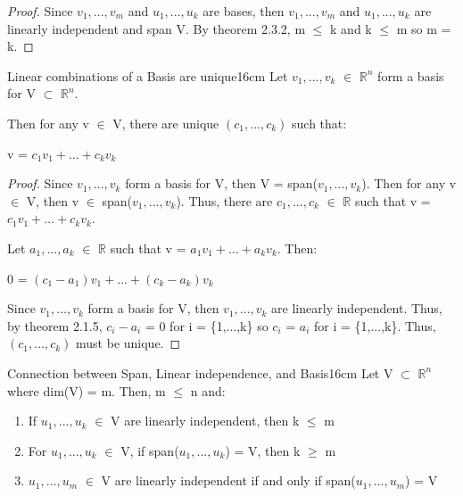     \begin{proof}
        Since $v_1,...,v_m$ and $u_1,...,u_k$ are bases,
        then $v_1,...,v_m$ and $u_1,...,u_k$ are linearly independent
        and span V.
        By {\color{red} theorem 2.3.2}, m $\leq$ k and k $\leq$ m
        so m = k.
    \end{proof}

    \vspace{0.5cm}



    \begin{wtheorem}{Linear combinations of a Basis are unique}{16cm}
        Let $v_1,...,v_k$ $\in$ $\mathbb{R}^n$ form a basis for
        V $\subset$ $\mathbb{R}^n$.
        
        Then for any v $\in$ V, there are unique $(c_1,...,c_k)$ such that:

        \hspace{0.5cm}
        v = $c_1v_1 + ... + c_kv_k$
    \end{wtheorem}

    \begin{proof}
        Since $v_1,...,v_k$ form a basis for V,
        then V = span($v_1,...,v_k$).
        Then for any v $\in$ V, then v $\in$ span($v_1,...,v_k$).
        Thus, there are $c_1,...,c_k$ $\in$ $\mathbb{R}$
        such that v = $c_1v_1 + ... + c_kv_k$.

        Let $a_1,...,a_k$ $\in$ $\mathbb{R}$ such that
        v = $a_1v_1 + ... + a_kv_k$. Then:

        \hspace{0.5cm}
        0 = $(c_1-a_1)v_1 + ... + (c_k-a_k)v_k$

        Since $v_1,...,v_k$ form a basis for V,
        then $v_1,...,v_k$ are linearly independent.
        Thus, by {\color{red} theorem 2.1.5}, $c_i - a_i$ = 0 for
        i = \{1,...,k\} so $c_i$ = $a_i$ for i = \{1,...,k\}.
        Thus, $(c_1,...,c_k)$ must be unique.
    \end{proof}

    \newpage



    \begin{wtheorem}{Connection between Span, Linear independence, and Basis}{16cm}
        Let V $\subset$ $\mathbb{R}^n$ where dim(V) = m. Then, m $\leq$ n and:
    \end{wtheorem}

    \begin{enumerate}[label=(\alph*), leftmargin=2cm, itemsep=0.1cm]
        \item If $u_1,...,u_k$ $\in$ V are linearly independent,
            then k $\leq$ m

        \item For $u_1,...,u_k$ $\in$ V, if span($u_1,...,u_k$) = V,
            then k $\geq$ m

        \item $u_1,...,u_m$ $\in$ V are linearly independent if and only if
            span($u_1,...,u_m$) = V
    \end{enumerate}

